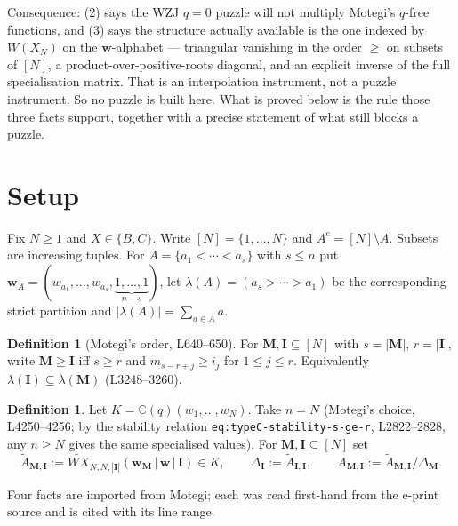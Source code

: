 \documentclass[11pt]{article}
\theoremstyle{plain}
\theoremstyle{definition}
\newtheorem{defn}[thm]{Definition}
\theoremstyle{remark}
\newcommand{\bI}{\mathbf{I}}
\newcommand{\bM}{\mathbf{M}}
\newcommand{\bw}{\mathbf{w}}
\newcommand{\WXt}{\widetilde{W\!X}}
\begin{document}
\noindent Consequence: (2) says the WZJ $q=0$ puzzle will not multiply Motegi's
$q$-free functions, and (3) says the structure actually available is the one
indexed by $W(X_N)$ on the $\bw$-alphabet --- triangular vanishing in the order
$\ge$ on subsets of $[N]$, a product-over-positive-roots diagonal, and an
explicit inverse of the full specialisation matrix.  That is an interpolation
instrument, not a puzzle instrument.  So no puzzle is built here.  What is
proved below is the rule those three facts support, together with a precise
statement of what still blocks a puzzle.

\section{Setup}

Fix $N\ge1$ and $X\in\{B,C\}$.  Write $[N]=\{1,\dots,N\}$ and
$A^{\mathrm c}=[N]\setminus A$.  Subsets are increasing tuples.  For
$A=\{a_1<\cdots<a_s\}$ with $s\le n$ put
$\bw_A=(w_{a_1},\dots,w_{a_s},\underbrace{1,\dots,1}_{n-s})$, let
$\lambda(A)=(a_s>\cdots>a_1)$ be the corresponding strict partition and
$|\lambda(A)|=\sum_{a\in A}a$.

\begin{defn}[Motegi's order, L640--650]
For $\bM,\bI\subseteq[N]$ with $s=|\bM|$, $r=|\bI|$, write $\bM\ge\bI$ iff
$s\ge r$ and $m_{s-r+j}\ge i_j$ for $1\le j\le r$.  Equivalently
$\lambda(\bI)\subseteq\lambda(\bM)$ (L3248--3260).
\end{defn}

\begin{defn}
Let $K=\mathbb C(q)(w_1,\dots,w_N)$.  Take $n=N$ (Motegi's choice, L4250--4256;
by the stability relation \texttt{eq:typeC-stability-s-ge-r}, L2822--2828, any
$n\ge N$ gives the same specialised values).  For $\bM,\bI\subseteq[N]$ set
\[
\widetilde A_{\bM,\bI}:=\WXt_{N,N,|\bI|}(\bw_{\bM}\,|\,\bw\,|\,\bI)\in K,
\qquad
\Delta_{\bI}:=\widetilde A_{\bI,\bI},
\qquad
A_{\bM,\bI}:=\widetilde A_{\bM,\bI}/\Delta_{\bM}.
\]
\end{defn}

Four facts are imported from Motegi; each was read first-hand from the e-print
source and is cited with its line range.
\end{document}
